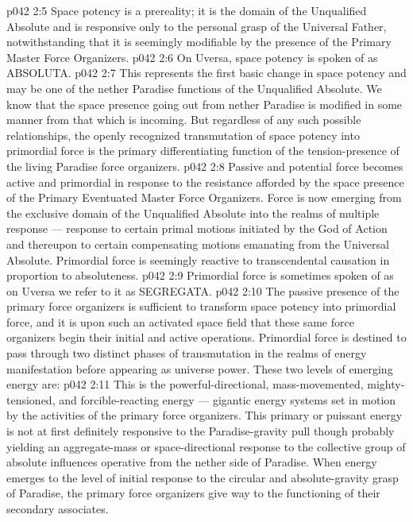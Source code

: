 \vs p042 2:5 Space potency is a prereality; it is the domain of the Unqualified Absolute and is responsive only to the personal grasp of the Universal Father, notwithstanding that it is seemingly modifiable by the presence of the Primary Master Force Organizers.
\vs p042 2:6 On Uversa, space potency is spoken of as ABSOLUTA.
\vs p042 2:7 \bibnobreakspace {} This represents the first basic change in space potency and may be one of the nether Paradise functions of the Unqualified Absolute. We know that the space presence going out from nether Paradise is modified in some manner from that which is incoming. But regardless of any such possible relationships, the openly recognized transmutation of space potency into primordial force is the primary differentiating function of the tension\hyp{}presence of the living Paradise force organizers.
\vs p042 2:8 Passive and potential force becomes active and primordial in response to the resistance afforded by the space presence of the Primary Eventuated Master Force Organizers. Force is now emerging from the exclusive domain of the Unqualified Absolute into the realms of multiple response --- response to certain primal motions initiated by the God of Action and thereupon to certain compensating motions emanating from the Universal Absolute. Primordial force is seemingly reactive to transcendental causation in proportion to absoluteness.
\vs p042 2:9 Primordial force is sometimes spoken of as  on Uversa we refer to it as SEGREGATA.
\vs p042 2:10 \bibnobreakspace {} The passive presence of the primary force organizers is sufficient to transform space potency into primordial force, and it is upon such an activated space field that these same force organizers begin their initial and active operations. Primordial force is destined to pass through two distinct phases of transmutation in the realms of energy manifestation before appearing as universe power. These two levels of emerging energy are:
\vs p042 2:11 \bibnobreakspace {} This is the powerful\hyp{}directional, mass\hyp{}movemented, mighty\hyp{}tensioned, and forcible\hyp{}reacting energy --- gigantic energy systems set in motion by the activities of the primary force organizers. This primary or puissant energy is not at first definitely responsive to the Paradise\hyp{}gravity pull though probably yielding an aggregate\hyp{}mass or space\hyp{}directional response to the collective group of absolute influences operative from the nether side of Paradise. When energy emerges to the level of initial response to the circular and absolute\hyp{}gravity grasp of Paradise, the primary force organizers give way to the functioning of their secondary associates.
